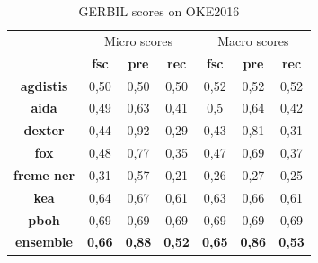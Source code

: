 \documentclass{llncs}
\begin{document}
\begin{table}[p]
      \centering
      \setlength{\tabcolsep}{12pt}
        \begin{tabular}{c|c|c|c|c|c|c|}
          \multicolumn{1}{c}{ } &
          \multicolumn{3}{|c|}{Micro scores} & 
          \multicolumn{3}{|c|}{Macro scores} \\
           \multicolumn{1}{c|}{ } & \textbf{fsc} & \textbf{pre} & \textbf{rec}
           & \textbf{fsc} & \textbf{pre} & \textbf{rec} \\ \hline
            \textbf{agdistis}         & 0,50  & 0,50   & 0,50  &  0,52  & 0,52   & 0,52  \\ \hline
            \textbf{aida}         & 0,49  & 0,63   & 0,41  &   0,5  & 0,64   & 0,42   \\ \hline
            \textbf{dexter}         & 0,44  & 0,92   & 0,29  &   0,43  & 0,81   & 0,31   \\ \hline
            \textbf{fox}         & 0,48  & 0,77   & 0,35  & 0,47  & 0,69   & 0,37   \\ \hline
            \textbf{freme ner}         & 0,31  & 0,57   & 0,21  &   0,26  & 0,27   & 0,25   \\ \hline
            \textbf{kea}         & 0,64  & 0,67   & 0,61  &   0,63  & 0,66   & 0,61  \\ \hline
            \textbf{pboh}         & 0,69  & 0,69   & 0,69  &   0,69  & 0,69   & 0,69   \\ \hline \hline
            \textbf{ensemble}        & \textbf{0,66}   & \textbf{0,88}   & \textbf{0,52} & \textbf{0,65}   & \textbf{0,86}   & \textbf{0,53}  \\ \hline
        \end{tabular}
    \caption{GERBIL scores on OKE2016}
    \label{linkscoresgerbiloke2016}
\end{table}
\end{document}
